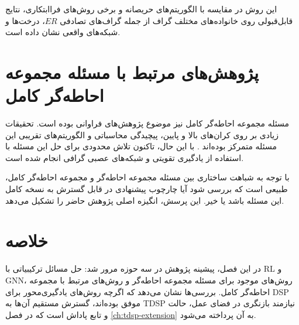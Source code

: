 این روش در مقایسه با الگوریتم‌های حریصانه و برخی روش‌های فراابتکاری، نتایج قابل‌قبولی روی خانواده‌های مختلف گراف از جمله گراف‌های تصادفی $ER$، درخت‌ها و شبکه‌های واقعی نشان داده است.

\section{پژوهش‌های مرتبط با مسئله مجموعه احاطه‌گر کامل}

مسئله مجموعه احاطه‌گر کامل نیز موضوع پژوهش‌های فراوانی بوده است. تحقیقات زیادی بر روی کران‌های بالا و پایین، پیچیدگی محاسباتی و الگوریتم‌های تقریبی این مسئله متمرکز بوده‌اند \cite{haynes1998fundamentals, cockayne2004total}. با این حال، تاکنون تلاش محدودی برای حل این مسئله با استفاده از یادگیری تقویتی و شبکه‌های عصبی گرافی انجام شده است.

با توجه به شباهت ساختاری بین مسئله مجموعه احاطه‌گر و مجموعه احاطه‌گر کامل، طبیعی است که بررسی شود آیا چارچوب پیشنهادی در \cite{chen2024dsp} قابل گسترش به نسخه کامل این مسئله باشد یا خیر. این پرسش، انگیزه اصلی پژوهش حاضر را تشکیل می‌دهد.

\section{خلاصه}

در این فصل، پیشینه پژوهش در سه حوزه مرور شد: حل مسائل ترکیبیاتی با RL و GNN، روش‌های موجود برای مسئله مجموعه احاطه‌گر و روش‌های مرتبط با مجموعه احاطه‌گر کامل. بررسی‌ها نشان می‌دهد که اگرچه روش‌های یادگیری‌محور برای DSP موفق بوده‌اند، گسترش مستقیم آن‌ها به TDSP نیازمند بازنگری در فضای عمل، حالت و تابع پاداش است که در فصل \ref{ch:tdsp-extension} به آن پرداخته می‌شود.
